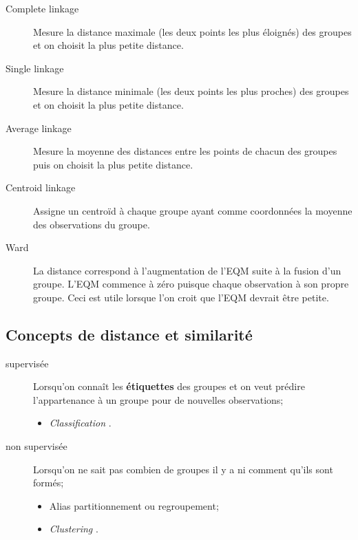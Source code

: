 \documentclass[10pt, french]{article}
\begin{document}
\begin{multicols*}{3}
\begin{definitionNOHFILLsub}[Liaisons]
\begin{description}
	\item[Complete linkage]	Mesure la distance maximale (les deux points les plus éloignés) des groupes et on choisit la plus petite distance.
	\item[Single linkage]	Mesure la distance minimale (les deux points les plus proches) des groupes et on choisit la plus petite distance.
	\item[Average linkage]	Mesure la moyenne des distances entre les points de chacun des groupes puis on choisit la plus petite distance.
	\item[Centroid linkage]	Assigne un centroïd à chaque groupe ayant comme coordonnées la moyenne des observations du groupe.
	\item[Ward]	La distance correspond à l'augmentation de l'EQM suite à la fusion d'un groupe. L'EQM commence à zéro puisque chaque observation à son propre groupe. Ceci est utile lorsque l'on croit que l'EQM devrait être petite.
\end{description}
\end{definitionNOHFILLsub}

\subsection*{Concepts de distance et similarité}

\begin{definitionNOHFILL}[Classification]
\begin{description}
	\item[supervisée]	Lorsqu'on connaît les \textbf{étiquettes} des groupes et on veut prédire l'appartenance à un groupe pour de nouvelles observations;
		\begin{itemize}[leftmargin = *] 
		\item	\og \textit{Classification} \fg{}.
		\end{itemize}
	\item[non supervisée]	Lorsqu'on ne sait pas combien de groupes il y a ni comment qu'ils sont formés;
		\begin{itemize}[leftmargin = *]
		\item	Alias partitionnement ou regroupement;
		\item	\og \textit{Clustering} \fg{}.
		\end{itemize}
\end{description}
\end{definitionNOHFILL}


\end{multicols*}
\end{document}
